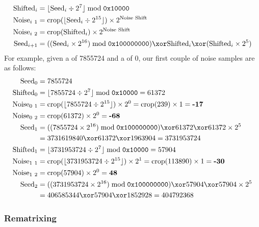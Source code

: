 \begin{align*}
\text{Shifted}_i &= \lfloor\text{Seed}_i \div 2 ^ 7\rfloor \bmod{\texttt{0x10000}} \\
\text{Noise}_{i~1} &= \text{crop}(\lfloor\text{Seed}_i \div 2 ^ {15}\rfloor) \times 2 ^ {\text{Noise Shift}} \\
\text{Noise}_{i~2} &= \text{crop}(\text{Shifted}_i) \times 2 ^ {\text{Noise Shift}} \\
\text{Seed}_{i + 1} &= ((\text{Seed}_i \times 2 ^ {16}) \bmod{\texttt{0x100000000}}) \xor \text{Shifted}_i \xor (\text{Shifted}_i \times 2 ^ 5)
\end{align*}
For example, given a  of 7855724 and a
 of 0, our first couple of noise samples are
as follows:
\begin{align*}
\text{Seed}_0 &= 7855724 \\
\text{Shifted}_0 &= \lfloor 7855724 \div 2 ^ 7\rfloor \bmod{\texttt{0x10000}} = 61372 \\
\text{Noise}_{0~1} &= \text{crop}(\lfloor 7855724 \div 2 ^ {15}\rfloor) \times 2 ^ 0 = \text{crop}(239) \times 1 = \textbf{-17} \\
\text{Noise}_{0~2} &= \text{crop}(61372) \times 2 ^ 0 = \textbf{-68} \\
\text{Seed}_1 &= ((7855724 \times 2 ^ {16}) \bmod{\texttt{0x100000000}}) \xor 61372 \xor 61372 \times 2 ^ 5 \\
&= 3731619840 \xor 61372 \xor 1963904 = 3731953724 \\
\text{Shifted}_1 &= \lfloor 3731953724 \div 2 ^ 7 \rfloor \bmod{\texttt{0x10000}} = 57904 \\
\text{Noise}_{1~1} &= \text{crop}(\lfloor 3731953724 \div 2 ^ {15}\rfloor) \times 2 ^ 1 = \text{crop}(113890) \times 1 = \textbf{-30} \\
\text{Noise}_{1~2} &= \text{crop}(57904) \times 2 ^ 0 = \textbf{48} \\
\text{Seed}_2 &= ((3731953724 \times 2 ^ {16}) \bmod{\texttt{0x100000000}}) \xor 57904 \xor 57904 \times 2 ^ 5 \\
&= 406585344 \xor 57904 \xor 1852928 = 404792368
\end{align*}

\clearpage

\subsubsection{Rematrixing}


